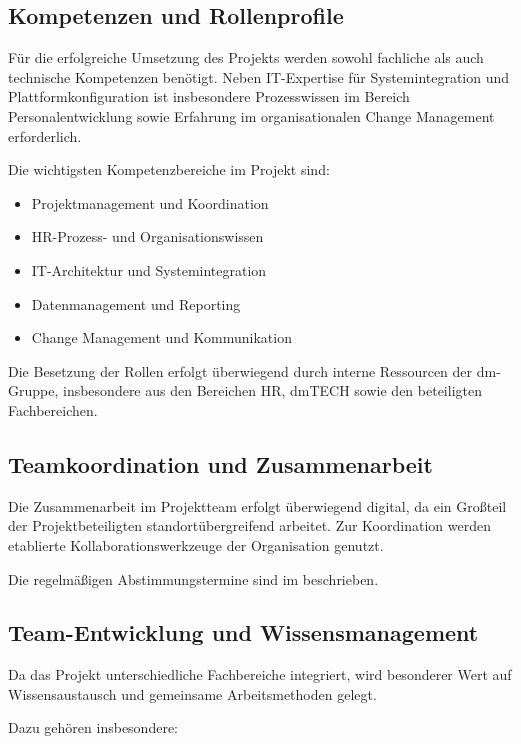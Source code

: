 \subsection{Kompetenzen und Rollenprofile}

Für die erfolgreiche Umsetzung des Projekts werden sowohl fachliche
als auch technische Kompetenzen benötigt. Neben IT-Expertise für
Systemintegration und Plattformkonfiguration ist insbesondere
Prozesswissen im Bereich Personalentwicklung sowie Erfahrung im
organisationalen Change Management erforderlich.

Die wichtigsten Kompetenzbereiche im Projekt sind:

\begin{itemize}
    \item Projektmanagement und Koordination
    \item HR-Prozess- und Organisationswissen
    \item IT-Architektur und Systemintegration
    \item Datenmanagement und Reporting
    \item Change Management und Kommunikation
\end{itemize}

Die Besetzung der Rollen erfolgt überwiegend durch interne
Ressourcen der dm-Gruppe, insbesondere aus den Bereichen HR,
dmTECH sowie den beteiligten Fachbereichen.

\subsection{Teamkoordination und Zusammenarbeit}

Die Zusammenarbeit im Projektteam erfolgt überwiegend digital,
da ein Großteil der Projektbeteiligten standortübergreifend arbeitet.
Zur Koordination werden etablierte Kollaborationswerkzeuge der
Organisation genutzt.

Die regelmäßigen Abstimmungstermine sind im
beschrieben.

\subsection{Team-Entwicklung und Wissensmanagement}

Da das Projekt unterschiedliche Fachbereiche integriert,
wird besonderer Wert auf Wissensaustausch und gemeinsame
Arbeitsmethoden gelegt.

Dazu gehören insbesondere:

